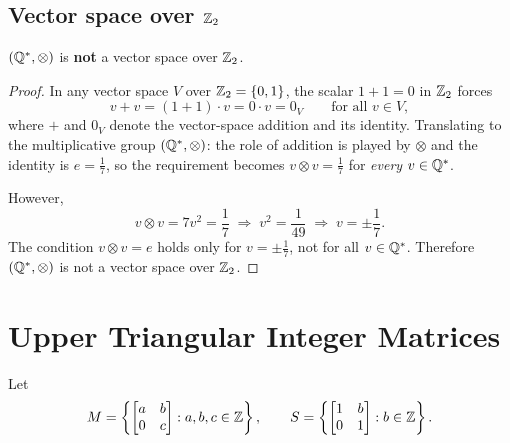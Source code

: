 \subsection{Vector space over \texorpdfstring{$\mathbb{Z}_2$}{Z\_2}}


\begin{proposition}
$(\mathbb{Q}^{*}, \otimes)$ is \textbf{not} a vector space over $\mathbb{Z}_2$.
\end{proposition}

\begin{proof}
In any vector space $V$ over $\mathbb{Z}_2 = \{0, 1\}$, the scalar $1+1 = 0$ in
$\mathbb{Z}_2$ forces
\[
    v + v = (1 + 1)\cdot v = 0 \cdot v = 0_V
    \qquad \text{for all } v \in V,
\]
where $+$ and $0_V$ denote the vector-space addition and its identity.
Translating to the multiplicative group $(\mathbb{Q}^{*}, \otimes)$: the role of
addition is played by $\otimes$ and the identity is $e = \tfrac{1}{7}$, so
the requirement becomes $v \otimes v = \tfrac{1}{7}$ for \emph{every}
$v \in \mathbb{Q}^{*}$.

However,
\[
    v \otimes v = 7v^2 = \frac{1}{7}
    \;\Longrightarrow\;
    v^2 = \frac{1}{49}
    \;\Longrightarrow\;
    v = \pm\frac{1}{7}.
\]
The condition $v \otimes v = e$ holds only for $v = \pm\tfrac{1}{7}$, not for
all $v \in \mathbb{Q}^{*}$. Therefore $(\mathbb{Q}^{*}, \otimes)$ is not a vector space over
$\mathbb{Z}_2$.
\end{proof}

\section{Upper Triangular Integer Matrices}

Let
\[
    M = \left\{
        \begin{bmatrix} a & b \\ 0 & c \end{bmatrix}
        : a, b, c \in \mathbb{Z}
    \right\},
    \qquad
    S = \left\{
        \begin{bmatrix} 1 & b \\ 0 & 1 \end{bmatrix}
        : b \in \mathbb{Z}
    \right\}.
\]

